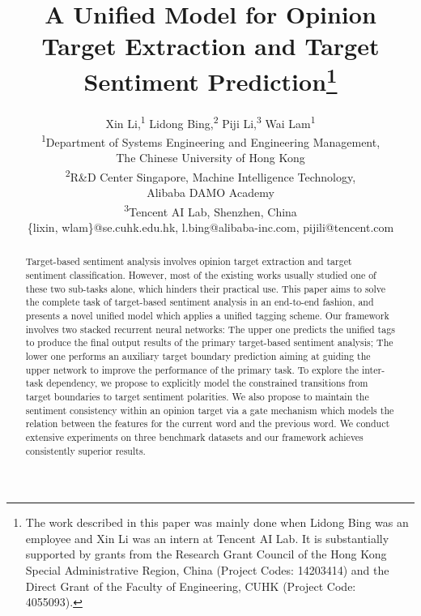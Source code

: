 \documentclass[letterpaper]{article}
\begin{document}
\title{A Unified Model for Opinion Target Extraction and Target Sentiment Prediction\thanks{The work described in this paper was mainly done when Lidong Bing was an employee and Xin Li was an intern at Tencent AI Lab. It is substantially supported by grants from the Research Grant Council of the Hong Kong Special Administrative Region, China (Project Codes: 14203414) and the Direct Grant of the Faculty of Engineering, CUHK (Project Code: 4055093).}}
\author{
Xin Li,\textsuperscript{\rm 1}
Lidong Bing,\textsuperscript{\rm 2}
Piji Li,\textsuperscript{\rm 3}
Wai Lam\textsuperscript{\rm 1}\\
\textsuperscript{\rm 1}Department of Systems Engineering and Engineering Management,\\ The Chinese University of Hong Kong\\
\textsuperscript{\rm 2}R\&D Center Singapore, Machine Intelligence Technology, \\ Alibaba DAMO Academy\\
\textsuperscript{\rm 3}Tencent AI Lab, Shenzhen, China \\
\{lixin, wlam\}@se.cuhk.edu.hk, l.bing@alibaba-inc.com, pijili@tencent.com
}
\maketitle
\begin{abstract}
Target-based sentiment analysis involves opinion target extraction and target sentiment classification. However, most of the existing works usually studied one of these two sub-tasks alone, which hinders their practical use. This paper aims to solve the complete task of target-based sentiment analysis in an end-to-end fashion, and presents a novel unified model which applies a unified tagging scheme. Our framework involves two stacked recurrent neural networks: The upper one predicts the unified tags to produce the final output results of the primary target-based sentiment analysis; The lower one performs an auxiliary target boundary prediction aiming at guiding the upper network to improve the performance of the primary task. To explore the inter-task dependency, we propose to explicitly model the constrained transitions from target boundaries to target sentiment polarities. We also propose to maintain the sentiment consistency within an opinion target via a gate mechanism which models the relation between the features for the current word and the previous word. We conduct extensive experiments on three benchmark datasets and our framework achieves consistently superior results.
\end{abstract}
\end{document}
